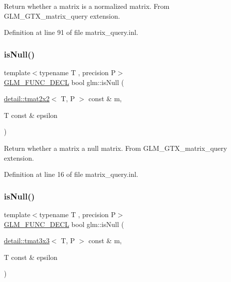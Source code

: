 Return whether a matrix is a normalized matrix. From G\+L\+M\+\_\+\+G\+T\+X\+\_\+matrix\+\_\+query extension. 

Definition at line 91 of file matrix\+\_\+query.\+inl.

\mbox{\label{group__gtx__matrix__query_gaf7e38680b67a3589a262d281660e4694}} 
\subsubsection{\texorpdfstring{is\+Null()}{isNull()}\hspace{0.1cm}{\footnotesize\ttfamily [1/3]}}
{\footnotesize\ttfamily template$<$typename T , precision P$>$ \\
\hyperlink{setup_8hpp_ab2d052de21a70539923e9bcbf6e83a51}{G\+L\+M\+\_\+\+F\+U\+N\+C\+\_\+\+D\+E\+CL} bool glm\+::is\+Null (\begin{DoxyParamCaption}\item[{\hyperlink{structglm_1_1detail_1_1tmat2x2}{detail\+::tmat2x2}$<$ T, P $>$ const \&}]{m,  }\item[{T const \&}]{epsilon }\end{DoxyParamCaption})}

Return whether a matrix a null matrix. From G\+L\+M\+\_\+\+G\+T\+X\+\_\+matrix\+\_\+query extension. 

Definition at line 16 of file matrix\+\_\+query.\+inl.

\mbox{\label{group__gtx__matrix__query_ga7a6ef9f174fec0224214ff5ba6c27ba4}} 
\subsubsection{\texorpdfstring{is\+Null()}{isNull()}\hspace{0.1cm}{\footnotesize\ttfamily [2/3]}}
{\footnotesize\ttfamily template$<$typename T , precision P$>$ \\
\hyperlink{setup_8hpp_ab2d052de21a70539923e9bcbf6e83a51}{G\+L\+M\+\_\+\+F\+U\+N\+C\+\_\+\+D\+E\+CL} bool glm\+::is\+Null (\begin{DoxyParamCaption}\item[{\hyperlink{structglm_1_1detail_1_1tmat3x3}{detail\+::tmat3x3}$<$ T, P $>$ const \&}]{m,  }\item[{T const \&}]{epsilon }\end{DoxyParamCaption})}

